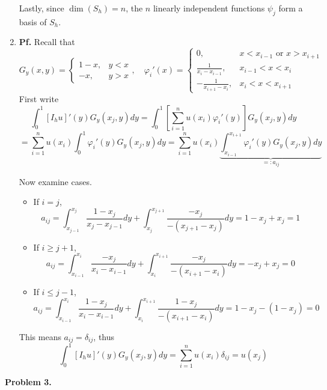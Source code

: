 \documentclass{article}
\def\tbf#1{\textbf{#1}}
\newcommand{\sbr}[1]{\left[#1\right]}
\newcommand{\vp}{\varphi}
\newcommand{\pf}{\tbf{Pf. }}
\begin{document}
\begin{enumerate}[label=(\alph*)]
Lastly, since $\dim(S_h)=n$, the $n$ linearly independent functions $\psi_j$ form a basis of $S_h$.


\item \pf Recall that
$$G_y(x,y) =
\begin{cases}
	1-x, & y<x\\
	-x, & y>x
\end{cases},
\quad \vp_i'(x) =
\begin{cases}
	0, & x<x_{i-1} \text{ or } x>x_{i+1}\\
	\frac{1}{x_i-x_{i-1}}, & x_{i-1}<x<x_i\\
	-\frac{1}{x_{i+1}-x_i}, & x_i<x<x_{i+1}
\end{cases}$$
First write
$$\int_0^1 [I_hu]'(y)G_y(x_j,y)dy
= \int_0^1 \sbr{\sum_{i=1}^n u(x_i)\vp_i'(y)}G_y(x_j,y)dy$$
$$= \sum_{i=1}^n u(x_i)\int_0^1 \vp_i'(y)G_y(x_j,y)dy
= \sum_{i=1}^n u(x_i)\underbrace{\int_{x_{i-1}}^{x_{i+1}} \vp_i'(y)G_y(x_j,y)dy}_{=:a_{ij}}$$

Now examine cases.
\begin{itemize}
	
	\item If $i=j$,
	$$a_{ij} = \int_{x_{j-1}}^{x_j}\frac{1-x_j}{x_j-x_{j-1}}dy + \int_{x_j}^{x_{j+1}}\frac{-x_j}{-(x_{j+1}-x_j)}dy
	= 1 - x_j + x_j
	= 1$$
	
	\item If $i\ge j+1$,
	$$a_{ij} = \int_{x_{i-1}}^{x_i}\frac{-x_j}{x_i-x_{i-1}}dy + \int_{x_i}^{x_{i+1}}\frac{-x_j}{-(x_{i+1}-x_i)}dy
	= -x_j + x_j
	= 0$$
	
	\item If $i\le j-1$,
	$$a_{ij} = \int_{x_{i-1}}^{x_i}\frac{1-x_j}{x_i-x_{i-1}}dy + \int_{x_i}^{x_{i+1}}\frac{1-x_j}{-(x_{i+1}-x_i)}dy
	= 1 - x_j - (1 - x_j)
	= 0$$	
	
\end{itemize}
This means $a_{ij}=\delta_{ij}$, thus
$$\int_0^1 [I_hu]'(y)G_y(x_j,y)dy = \sum_{i=1}^n u(x_i)\delta_{ij} = u(x_j)$$


	
\end{enumerate}



\tbf{Problem 3.}
\end{document}
